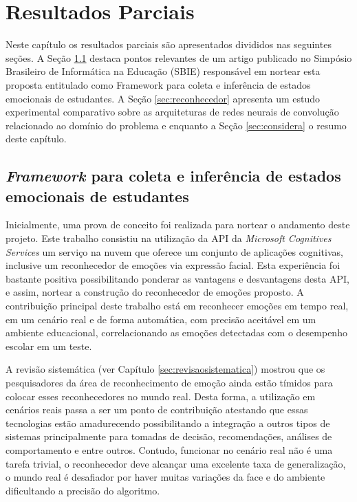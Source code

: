 \chapter{Resultados Parciais}\label{sec:resultados}
Neste capítulo os resultados parciais são apresentados divididos nas seguintes seções. A Seção \ref{sec:prova} destaca pontos relevantes de um artigo publicado no Simpósio Brasileiro de Informática na Educação (SBIE) responsável em nortear esta proposta entitulado como Framework para coleta e inferência de estados emocionais de estudantes. A Seção \ref{sec:reconhecedor} apresenta um estudo experimental comparativo sobre as arquiteturas de redes neurais de convolução relacionado ao domínio do problema e enquanto a Seção \ref{sec:considera} o resumo deste capítulo.   


\section{\textit{Framework} para coleta e inferência de estados emocionais de estudantes}\label{sec:prova}
Inicialmente, uma prova de conceito foi realizada para nortear o andamento deste projeto. Este trabalho \citep{cruz2017framework} consistiu na utilização da API da \textit{Microsoft Cognitives Services} um serviço na nuvem que oferece um conjunto de aplicações cognitivas, inclusive um reconhecedor de emoções via expressão facial. Esta experiência foi bastante positiva possibilitando ponderar as vantagens e desvantagens desta API, e assim, nortear a construção do reconhecedor de emoções proposto. A contribuição principal deste trabalho está em reconhecer emoções em tempo real, em um cenário real e de forma automática, com precisão aceitável em um ambiente educacional, correlacionando as emoções detectadas com o desempenho escolar em um teste. 

A revisão sistemática (ver Capítulo \ref{sec:revisaosistematica}) mostrou que os pesquisadores da área de reconhecimento de emoção ainda estão tímidos para colocar esses reconhecedores no mundo real. Desta forma, a utilização em cenários reais passa a ser um ponto de contribuição atestando que essas tecnologias estão amadurecendo possibilitando a integração a outros tipos de sistemas principalmente para tomadas de decisão, recomendações, análises de comportamento e entre outros. Contudo, funcionar no cenário real não é uma tarefa trivial, o reconhecedor deve alcançar uma excelente taxa de generalização, o mundo real é desafiador por haver muitas variações da face e do ambiente dificultando a precisão do algoritmo.  

